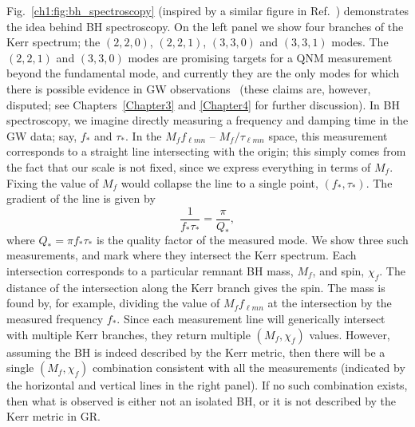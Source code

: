 Fig.~\ref{ch1:fig:bh_spectroscopy} (inspired by a similar figure in Ref.~\cite{Dreyer:2003bv}) demonstrates the idea behind BH spectroscopy.
On the left panel we show four branches of the Kerr spectrum; the $(2,2,0)$, $(2,2,1)$, $(3,3,0)$ and $(3,3,1)$ modes.
The $(2,2,1)$ and $(3,3,0)$ modes are promising targets for a QNM measurement beyond the fundamental mode, and currently they are the only modes for which there is possible evidence in GW observations~\cite{Isi:2019aib, Capano:2021etf} (these claims are, however, disputed; see Chapters~\ref{Chapter3} and \ref{Chapter4} for further discussion).
In BH spectroscopy, we imagine directly measuring a frequency and damping time in the GW data; say, $f_*$ and $\tau_*$.
In the $M_f f_{\ell m n}$ -- $M_f/\tau_{\ell m n}$ space, this measurement corresponds to a straight line intersecting with the origin; this simply comes from the fact that our scale is not fixed, since we express everything in terms of $M_f$. 
Fixing the value of $M_f$ would collapse the line to a single point, $(f_*,\tau_*)$.
The gradient of the line is given by
\begin{equation}
    \frac{1}{f_* \tau_*} = \frac{\pi}{Q_*},
\end{equation}
where $Q_* = \pi f_* \tau_*$ is the quality factor of the measured mode.
We show three such measurements, and mark where they intersect the Kerr spectrum.
Each intersection corresponds to a particular remnant BH mass, $M_f$, and spin, $\chi_f$. 
The distance of the intersection along the Kerr branch gives the spin.
The mass is found by, for example, dividing the value of $M_f f_{\ell m n}$ at the intersection by the measured frequency $f_*$.
Since each measurement line will generically intersect with multiple Kerr branches, they return multiple $(M_f, \chi_f)$ values. 
However, assuming the BH is indeed described by the Kerr metric, then there will be a single $(M_f,\chi_f)$ combination consistent with all the measurements (indicated by the horizontal and vertical lines in the right panel).
If no such combination exists, then what is observed is either not an isolated BH, or it is not described by the Kerr metric in GR. 

